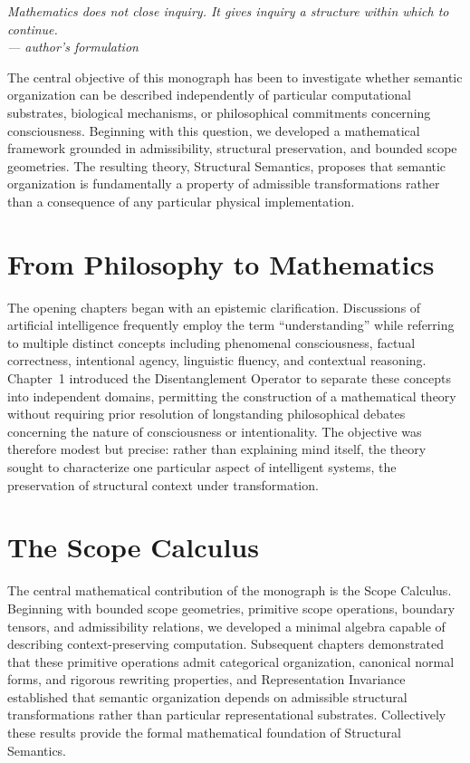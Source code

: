 \documentclass[11pt,twoside,openright]{book}
\numberwithin{equation}{chapter}
\theoremstyle{definition}
\theoremstyle{plain}
\theoremstyle{remark}
\theoremstyle{definition}
\begin{document}
\vspace{1em}
\begin{flushright}\itshape
Mathematics does not close inquiry. It gives inquiry a structure within
which to continue.\\
\upshape --- author's formulation
\end{flushright}
\vspace{1em}

The central objective of this monograph has been to investigate whether
semantic organization can be described independently of particular
computational substrates, biological mechanisms, or philosophical
commitments concerning consciousness. Beginning with this question, we
developed a mathematical framework grounded in admissibility, structural
preservation, and bounded scope geometries. The resulting theory,
Structural Semantics, proposes that semantic organization is
fundamentally a property of admissible transformations rather than a
consequence of any particular physical implementation.

\section{From Philosophy to Mathematics}

The opening chapters began with an epistemic clarification. Discussions
of artificial intelligence frequently employ the term ``understanding''
while referring to multiple distinct concepts including phenomenal
consciousness, factual correctness, intentional agency, linguistic
fluency, and contextual reasoning. Chapter~1 introduced the
Disentanglement Operator to separate these concepts into independent
domains, permitting the construction of a mathematical theory without
requiring prior resolution of longstanding philosophical debates
concerning the nature of consciousness or intentionality. The objective
was therefore modest but precise: rather than explaining mind itself, the
theory sought to characterize one particular aspect of intelligent
systems, the preservation of structural context under transformation.

\section{The Scope Calculus}

The central mathematical contribution of the monograph is the Scope
Calculus. Beginning with bounded scope geometries, primitive scope
operations, boundary tensors, and admissibility relations, we developed a
minimal algebra capable of describing context-preserving computation.
Subsequent chapters demonstrated that these primitive operations admit
categorical organization, canonical normal forms, and rigorous rewriting
properties, and Representation Invariance established that semantic
organization depends on admissible structural transformations rather
than particular representational substrates. Collectively these results
provide the formal mathematical foundation of Structural Semantics.
\end{document}

